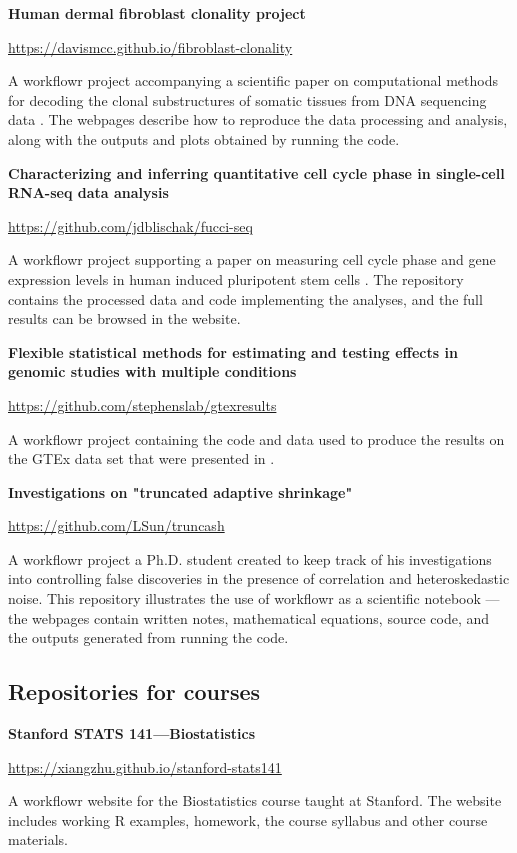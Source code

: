 \documentclass[9pt,a4paper]{extarticle}
\begin{document}
\textbf{Human dermal fibroblast clonality project}

\url{https://davismcc.github.io/fibroblast-clonality}

A workflowr project accompanying a scientific paper on computational
methods for decoding the clonal substructures of somatic tissues from
DNA sequencing data \cite{McCarthy2018}. The webpages describe how to
reproduce the data processing and analysis, along with the outputs and
plots obtained by running the code.

\textbf{Characterizing and inferring quantitative cell cycle phase in
single-cell RNA-seq data analysis}

\url{https://github.com/jdblischak/fucci-seq}

A workflowr project supporting a paper on measuring cell cycle phase and
gene expression levels in human induced pluripotent stem cells
\cite{Hsiao2019}. The repository contains the processed data and code
implementing the analyses, and the full results can be browsed in the
website.

\textbf{Flexible statistical methods for estimating and testing effects
in genomic studies with multiple conditions}

\url{https://github.com/stephenslab/gtexresults}

A workflowr project containing the code and data used to produce the
results on the GTEx data set that were presented in \cite{Urbut2019}.

\textbf{Investigations on "truncated adaptive shrinkage"}

\url{https://github.com/LSun/truncash}

A workflowr project a Ph.D. student created to keep track of his
investigations into controlling false discoveries in the presence of
correlation and heteroskedastic noise. This repository illustrates the
use of workflowr as a scientific notebook --- the webpages contain
written notes, mathematical equations, source code, and the outputs
generated from running the code.

\subsection*{Repositories for courses}

\textbf{Stanford STATS 141—Biostatistics}

\url{https://xiangzhu.github.io/stanford-stats141}

A workflowr website for the Biostatistics course taught at Stanford. The
website includes working R examples, homework, the course syllabus and
other course materials.
\end{document}
